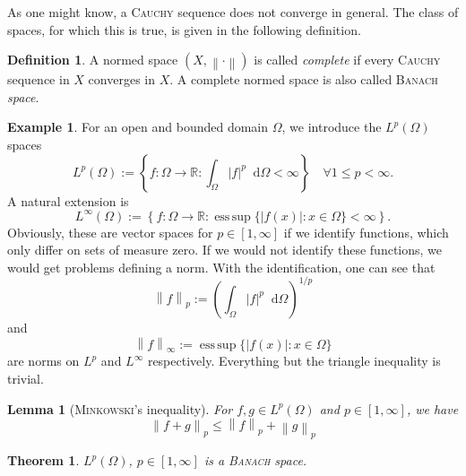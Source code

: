 \documentclass[12pt,a4paper,twoside, open=right]{scrreprt}
\theoremstyle{definition}
\newtheorem{defn}[auf]{Definition}
\newtheorem{bsp}[auf]{Example}
\theoremstyle{plain}
\newtheorem{sa}[auf]{Theorem}
\newtheorem{lem}[auf]{Lemma}
\DeclareMathOperator*{\esssup}{ess\,sup} %
\newcommand{\abs}[1]{\left\vert #1\right\vert}
\newcommand{\rr}{\mathbb{R}}
\newcommand{\norm}[1]{\left\lVert#1\right\rVert}
\newcommand{\D}{\mathop{}\!\mathrm{d}}
\begin{document}
As one might know, a \textsc{Cauchy} sequence does not converge in general. The class of spaces, for which this is true, is given in the following definition.
\begin{defn}
    A normed space $(X, \norm{\cdot})$ is called \emph{complete} if every \textsc{Cauchy} sequence in $X$ converges in $X$. A complete normed space is also called \textsc{Banach} \emph{space}.
\end{defn}
\begin{bsp}
    For an open and bounded domain $\Omega$, we introduce the $L^p(\Omega)$ spaces
    \begin{equation}
        L^p(\Omega):=\left\{f\colon\Omega\to\rr\colon\int_\Omega \abs{f}^p\D\Omega <\infty\right\} \quad\forall 1\le p<\infty.
    \end{equation}
    A natural extension is 
    \begin{equation}
        L^\infty(\Omega):=\left\{f\colon\Omega\to\rr\colon \esssup\{\abs{f(x)}\colon x\in\Omega\}<\infty\right\}.
    \end{equation}
    Obviously, these are vector spaces for $p\in[1,\infty]$ if we identify functions, which only differ on sets of measure zero. If we would not identify these functions, we would get problems defining a norm. With the identification, one can see that 
    \begin{equation}
        \norm{f}_{p}:=\left(\int_\Omega\abs{f}^p\D\Omega\right)^{1/p}
    \end{equation}
    and 
    \begin{equation}
        \norm{f}_{\infty}:=\esssup\{\abs{f(x)}\colon x\in\Omega\}
    \end{equation}
    are norms on $L^p$ and $L^\infty$ respectively. Everything but the triangle inequality is trivial.
\end{bsp}
\begin{lem}[\textsc{Minkowski}'s inequality]
    For $f,g\in L^p(\Omega)$ and $p\in[1,\infty]$, we have
    \begin{equation}
        \norm{f+g}_p\le\norm{f}_p+\norm{g}_p
    \end{equation}
\end{lem}
\begin{sa}
    $L^p(\Omega)$, $p\in[1,\infty]$ is a \textsc{Banach} space.
\end{sa}
\end{document}
